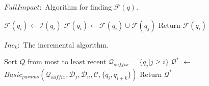 \begin{algorithm}[t]
\scriptsize
\caption{$FullImpact:$ Algorithm for finding $\mathcal{F}(q)$.}
\label{alg:fullimpact}
\begin{algorithmic}[2]
\STATE $\mathcal{F}(q_i) \leftarrow \mathcal{I}(q_i)$
\STATE $\mathcal{F}(q_i) \leftarrow \mathcal{F}(q_i) \cup \mathcal{F}(q_j)$
\ENDIF
\ENDFOR
\STATE Return $\mathcal{F}(q_i)$
\end{algorithmic}
\end{algorithm}

\begin{algorithm}[t]
\caption{$Inc_k:$ The incremental algorithm. 
}
\scriptsize
\label{alg:incalg}
\begin{algorithmic}[2]
\STATE Sort $Q$ from most to least recent
  \STATE $\mathcal{Q}_{suffix}$ = $\{q_j | j \ge i \}$ 
  \STATE $\mathcal{Q}^*$ $\leftarrow$ $Basic_{params}(\mathcal{Q}_{suffix}, \mathcal{D}_j, \mathcal{D}_n, \mathcal{C}, \{q_i, q_{i+k}\})$
    \STATE Return $\mathcal{Q}^*$
  \ENDIF
\ENDFOR
\end{algorithmic}
\end{algorithm}





